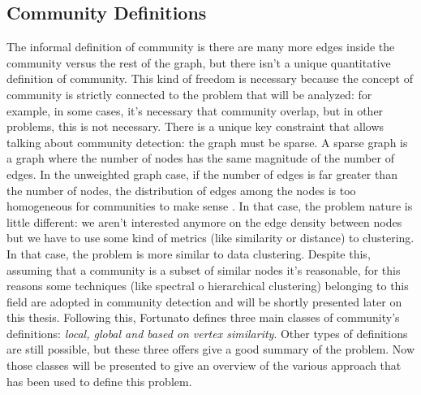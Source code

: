 \subsection{Community Definitions}
The informal definition of community is there are many more edges inside the community versus the rest of the graph, but there isn't a unique quantitative definition of community. This kind of freedom is necessary because the concept of community is strictly connected to the problem that will be analyzed: for example, in some cases, it's necessary that community overlap, but in other problems, this is not necessary. There is a unique key constraint that allows talking about community detection: the graph must be sparse. A sparse graph is a graph where the number of nodes has the same magnitude of the number of edges. In the unweighted graph case, if the number of edges is far greater than the number of nodes, the distribution of edges among the nodes is too homogeneous for communities to make sense \cite{fortunato}. In that case, the problem nature is little different: we aren't interested anymore on the edge density between nodes but we have to use some kind of metrics (like similarity or distance) to clustering. In that case, the problem is more similar to data clustering. Despite this, assuming that a community is a subset of similar nodes it's reasonable, for this reasons some techniques (like spectral o hierarchical clustering) belonging to this field are adopted in community detection and will be shortly presented later on this thesis.
Following this, Fortunato \cite{fortunato} defines three main classes of community's definitions: \textit{local, global and based on vertex similarity}. Other types of definitions are still possible, but these three offers give a good summary of the problem. Now those classes will be presented to give an overview of the various approach that has been used to define this problem. 
